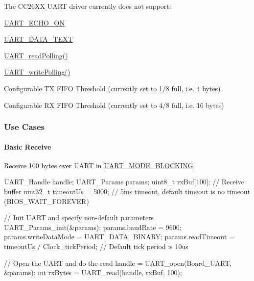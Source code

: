 The C\+C26\+X\+X U\+A\+R\+T driver currently does not support\+:
\begin{DoxyItemize}
\item \hyperlink{_u_a_r_t_8h_aac6a03c2e1d76f53e1d9d923dcdc24f2a6c4d8a2d4e30c22cf9fa45cd1bf79306}{U\+A\+R\+T\+\_\+\+E\+C\+H\+O\+\_\+\+O\+N}
\item \hyperlink{_u_a_r_t_8h_a694090fdb166f94ac30b809f9cba87b8a87fdfb7ca981eab7f56c51380fd7094e}{U\+A\+R\+T\+\_\+\+D\+A\+T\+A\+\_\+\+T\+E\+X\+T}
\item \hyperlink{_u_a_r_t_8h_aee4c56b20ea1c4c33406d99369db3df1}{U\+A\+R\+T\+\_\+read\+Polling()}
\item \hyperlink{_u_a_r_t_8h_aed09b432b5ebb7d88e78ccfe338e1bd4}{U\+A\+R\+T\+\_\+write\+Polling()}
\item Configurable T\+X F\+I\+F\+O Threshold (currently set to 1/8 full, i.\+e. 4 bytes)
\item Configurable R\+X F\+I\+F\+O Threshold (currently set to 4/8 full, i.\+e. 16 bytes)
\end{DoxyItemize}

\subsubsection*{Use Cases\label{_u_a_r_t_c_c26_x_x_8h_USE_CASES}%
\hypertarget{_u_a_r_t_c_c26_x_x_8h_USE_CASES}{}%
}

\paragraph*{Basic Receive}

Receive 100 bytes over U\+A\+R\+T in \hyperlink{_u_a_r_t_8h_a2507a620dba95cd20885c52494d19e90ae6b6bd5d2d5df859ad6724e89e605ebf}{U\+A\+R\+T\+\_\+\+M\+O\+D\+E\+\_\+\+B\+L\+O\+C\+K\+I\+N\+G}. 
\begin{DoxyCode}
UART_Handle handle;
UART_Params params;
uint8\_t rxBuf[100];         \textcolor{comment}{// Receive buffer}
uint32\_t timeoutUs = 5000;  \textcolor{comment}{// 5ms timeout, default timeout is no timeout (BIOS\_WAIT\_FOREVER)}

\textcolor{comment}{// Init UART and specify non-default parameters}
UART_Params_init(&params);
params.baudRate      = 9600;
params.writeDataMode = UART_DATA_BINARY;
params.readTimeout   = timeoutUs / Clock\_tickPeriod; \textcolor{comment}{// Default tick period is 10us}

\textcolor{comment}{// Open the UART and do the read}
handle = UART_open(Board\_UART, &params);
\textcolor{keywordtype}{int} rxBytes = UART_read(handle, rxBuf, 100);
\end{DoxyCode}


